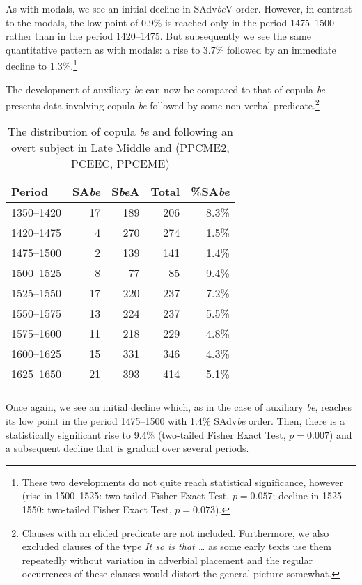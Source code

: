 \documentclass[output=paper]{langsci/langscibook}
\begin{document}
As with modals, we see an initial decline in SAdv\emph{be}V order. However,
in contrast to the modals, the low point of 0.9\% is reached only in the period
1475--1500 rather than in the period 1420--1475. But subsequently we see the same
quantitative pattern as with modals: a rise to 3.7\% followed by an immediate
decline to 1.3\%.\footnote{These two developments do not quite reach
statistical significance, however (rise in 1500--1525: two-tailed Fisher Exact
Test, $p = 0.057$; decline in 1525--1550: two-tailed Fisher Exact Test, $p =
0.073$).}

The development of auxiliary \emph{be} can now be compared to that of copula
\emph{be}.  presents data involving copula \emph{be}
followed by some non-verbal {predicate}.\footnote{Clauses with an elided
    predicate are not included. Furthermore, we also excluded clauses of the
type \emph{It so is that …} as some early texts use them repeatedly without
variation in adverbial placement and the regular occurrences of these clauses
would distort the general picture somewhat.}

\begin{table}[htbp]
\caption{The distribution of copula \emph{be} and  following an overt
subject in Late Middle and  (PPCME2, PCEEC,
PPCEME)\label{tab:key:09.3}}
\begin{tabular}{lrrrr}
\lsptoprule
{Period} & {SA\emph{be}} & {S\emph{be}A} & {Total} & {\%SA\emph{be}}\\
\midrule
1350--1420 & 17 & 189 & 206 & 8.3\%\\
1420--1475 & 4 & 270 & 274 & 1.5\%\\
1475--1500 & 2 & 139 & 141 & 1.4\%\\
1500--1525 & 8 & 77 & 85 & 9.4\%\\
1525--1550 & 17 & 220 & 237 & 7.2\%\\
1550--1575 & 13 & 224 & 237 & 5.5\%\\
1575--1600 & 11 & 218 & 229 & 4.8\%\\
1600--1625 & 15 & 331 & 346 & 4.3\%\\
1625--1650 & 21 & 393 & 414 & 5.1\%\\
\lspbottomrule
\end{tabular}
\end{table}

Once again, we see an initial decline which, as in the case of auxiliary
\emph{be}, reaches its low point in the period 1475--1500 with 1.4\%
SAdv\emph{be} order. Then, there is a statistically significant rise to 9.4\%
(two-tailed Fisher Exact Test, $p = 0.007$) and a subsequent decline that is
gradual over several periods.
\end{document}

